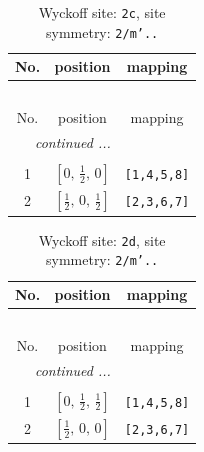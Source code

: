 \documentclass[fleqn,8pt]{jsarticle}
\begin{document}
\renewcommand{\arraystretch}{1.2}
\begin{longtable}{ccc}
\caption{Wyckoff site: {\tt 2c}, site symmetry: {\tt 2/m'..}}
 \\
 \hline \hline
No. & position & mapping \\ \hline \endfirsthead

\multicolumn{2}{l}{\tablename\ \thetable{}} \\
 \hline \hline
No. & position & mapping \\ \hline \endhead

 \hline \hline
\multicolumn{2}{r}{\footnotesize\it continued ...} \\ \endfoot

 \hline \hline
\multicolumn{2}{r}{} \\ \endlastfoot

1 & $\left[ 0,\, \frac{1}{2},\, 0 \right]$ & {\tt [1,4,5,8]} \\ \hline
2 & $\left[ \frac{1}{2},\, 0,\, \frac{1}{2} \right]$ & {\tt [2,3,6,7]} \\
\end{longtable}
\renewcommand{\arraystretch}{1.2}
\begin{longtable}{ccc}
\caption{Wyckoff site: {\tt 2d}, site symmetry: {\tt 2/m'..}}
 \\
 \hline \hline
No. & position & mapping \\ \hline \endfirsthead

\multicolumn{2}{l}{\tablename\ \thetable{}} \\
 \hline \hline
No. & position & mapping \\ \hline \endhead

 \hline \hline
\multicolumn{2}{r}{\footnotesize\it continued ...} \\ \endfoot

 \hline \hline
\multicolumn{2}{r}{} \\ \endlastfoot

1 & $\left[ 0,\, \frac{1}{2},\, \frac{1}{2} \right]$ & {\tt [1,4,5,8]} \\ \hline
2 & $\left[ \frac{1}{2},\, 0,\, 0 \right]$ & {\tt [2,3,6,7]} \\
\end{longtable}
\renewcommand{\arraystretch}{1.2}
\end{document}
